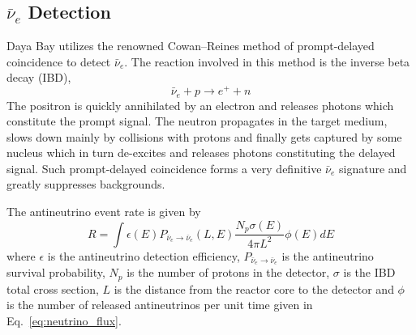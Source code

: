 \subsection{\texorpdfstring{$\bar{\nu}_e$}{Electron Antineutrino} Detection}
Daya Bay utilizes the renowned Cowan–Reines method of prompt-delayed coincidence to detect $\bar{\nu}_e$. The reaction involved in this method is the inverse beta decay (IBD),
\begin{equation}
	\bar{\nu}_e+p\longrightarrow e^++n
\end{equation}
The positron is quickly annihilated by an electron and releases photons which constitute the prompt signal. The neutron propagates in the target medium, slows down mainly by collisions with protons and finally gets captured by some nucleus which in turn de-excites and releases photons constituting the delayed signal. Such prompt-delayed coincidence forms a very definitive $\bar{\nu}_e$ signature and greatly suppresses backgrounds.

The antineutrino event rate is given by
\begin{equation}
	R=\int \epsilon(E)P_{\bar{\nu}_e\rightarrow\bar{\nu}_e}(L,E)\frac{N_p\sigma(E)}{4\pi L^2}\phi(E)dE
\end{equation}
where $\epsilon$ is the antineutrino detection efficiency, $P_{\bar{\nu}_e\rightarrow\bar{\nu}_e}$ is the antineutrino survival probability, $N_p$ is the number of protons in the detector, $\sigma$ is the IBD total cross section, $L$ is the distance from the reactor core to the detector and $\phi$ is the number of released antineutrinos per unit time given in Eq.~\ref{eq:neutrino_flux}.

